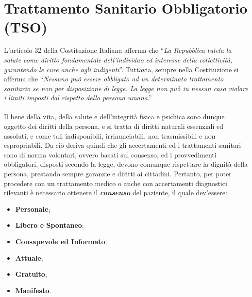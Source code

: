 \section{Trattamento Sanitario Obbligatorio (TSO)}

L'articolo 32 della Costituzione Italiana afferma che ``\emph{La
Repubblica tutela la salute come diritto fondamentale dell'individuo ed
interesse della collettività, garantendo le cure anche agli
indigenti}''. Tuttavia, sempre nella Costituzione si afferma che
``\emph{Nessuno può essere obbligato ad un determinato trattamento
sanitario se non per disposizione di legge. La legge non può in nessun
caso violare i limiti imposti dal rispetto della persona umana}.''
\\\\
Il bene della vita, della salute e dell'integrità fisica e psichica sono
dunque oggetto dei diritti della persona, e si tratta di diritti
naturali essenziali ed assoluti, e come tali indisponibili,
irrinunciabili, non trasmissibili e non espropriabili. Da ciò deriva
quindi che gli accertamenti ed i trattamenti sanitari sono di norma
volontari, ovvero basati sul consenso, ed i provvedimenti obbligatori,
disposti secondo la legge, devono comunque rispettare la dignità della
persona, prestando sempre garanzie e diritti ai cittadini. Pertanto, per
poter procedere con un trattamento medico o anche con accertamenti
diagnostici rilevanti è necessario ottenere il \textbf{\emph{consenso}}
del paziente, il quale dev'essere:

\begin{itemize}
\item
  \textbf{Personale};
\item
  \textbf{Libero e Spontaneo};
\item
  \textbf{Consapevole ed Informato};
\item
  \textbf{Attuale};
\item
  \textbf{Gratuito};
\item
  \textbf{Manifesto}.
\end{itemize}

